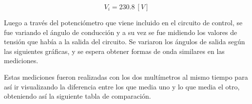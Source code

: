 \begin{equation*}
    V_i = 230.8 ~[V]
\end{equation*}

Luego a través del potenciómetro que viene incluido en el circuito de control, se fue variando el ángulo de conducción y a su vez se fue midiendo los valores de tensión que había a la salida del circuito. Se variaron los ángulos de salida según las siguientes gráficas, y se espera obtener formas de onda similares en las mediciones.

\begin{figure}[H]
    \centering
    \begin{minipage}{0.49\textwidth}
        \centering
        
    \end{minipage}
    \begin{minipage}{0.49\textwidth}
        \centering
        
    \end{minipage}
    \begin{minipage}{0.49\textwidth}
        \centering
        
    \end{minipage}
    \centering
    \begin{minipage}{0.49\textwidth}
    \centering
        
    \end{minipage}
    \begin{minipage}{0.49\textwidth}
    \centering
        
    \end{minipage}
    \begin{minipage}{0.49\textwidth}
    \centering
        
    \end{minipage}
\end{figure}



Estas mediciones fueron realizadas con los dos multímetros al mismo tiempo para así ir visualizando la diferencia entre los que media uno y lo que media el otro, obteniendo así la siguiente tabla de comparación.

